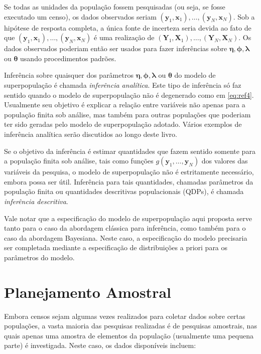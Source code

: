 \documentclass[
  12pt,
  brazilian,
]{book}
\theoremstyle{definition}
\theoremstyle{definition}
\theoremstyle{definition}
\theoremstyle{definition}
\theoremstyle{remark}
\begin{document}
Se todas as unidades da população fossem pesquisadas (ou seja, se fosse
executado um censo), os dados observados seriam
\((\mathbf{y}_1 , \mathbf{x}_1) ,\ldots, (\mathbf{y}_N , \mathbf{x}_N)\). Sob a
hipótese de resposta completa, a única fonte de incerteza seria devida ao fato
de que \((\mathbf{y}_1 , \mathbf{x}_1) ,\ldots, (\mathbf{y}_N , \mathbf{x}_N)\) é
uma realização de
\(\left( \mathbf{Y}_1 , \mathbf{X}_1 \right) ,\ldots, \left( \mathbf{Y}_N , \mathbf{X}_N \right)\).
Os dados observados poderiam então ser usados para fazer inferências sobre
\(\mathbf{\eta}, \mathbf{\phi},\mathbf{\lambda}\) ou \(\mathbf{\theta}\) usando
procedimentos padrões.

Inferência sobre quaisquer dos parâmetros
\(\mathbf{\eta},\mathbf{\phi},\mathbf{\lambda}\) ou \(\mathbf{\theta}\) do modelo de
superpopulação é chamada \emph{inferência analítica}. Este tipo de inferência só faz
sentido quando o modelo de superpopulação não é degenerado como em
\eqref{eq:ref4}. Usualmente seu objetivo é explicar a relação entre variáveis não
apenas para a população finita sob análise, mas também para outras populações
que poderiam ter sido geradas pelo modelo de superpopulação adotado. Vários
exemplos de inferência analítica serão discutidos ao longo deste livro.

Se o objetivo da inferência é estimar quantidades que fazem sentido somente para
a população finita sob análise, tais como funções
\(g\left( \mathbf{y}_1 ,\ldots, \mathbf{y}_N \right)\) dos valores das variáveis
da pesquisa, o modelo de superpopulação não é estritamente necessário, embora
possa ser útil. Inferência para tais quantidades, chamadas parâmetros da
população finita ou quantidades descritivas populacionais (QDPs), é chamada
\emph{inferência descritiva}.

Vale notar que a especificação do modelo de superpopulação aqui proposta serve
tanto para o caso da abordagem clássica para inferência, como também para o caso
da abordagem Bayesiana. Neste caso, a especificação do modelo precisaria ser
completada mediante a especificação de distribuições a priori para os parâmetros
do modelo.

\hypertarget{planamo}{%
\section{Planejamento Amostral}\label{planamo}}

Embora censos sejam algumas vezes realizados para coletar dados sobre certas
populações, a vasta maioria das pesquisas realizadas é de pesquisas amostrais,
nas quais apenas uma amostra de elementos da população (usualmente uma pequena
parte) é investigada. Neste caso, os dados disponíveis incluem:
\end{document}
